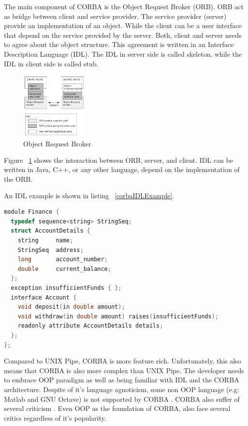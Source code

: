 \documentclass[conference]{IEEEtran}
\begin{document}
The main component of CORBA is the Object Request Broker (ORB). ORB act as bridge 
between client and service provider. The service provider (server) provide an 
implementation of an object. While the client can be a user interface that depend on
the service provided by the server. Both, client and server needs to agree about the
object structure. This agreement is written in an Interface Description Language (IDL).
The IDL in server side is called skeleton, while the IDL in client side is called stub.

\begin{figure}
	\centering
	\includegraphics[width=0.3\textwidth]
		{images/Orb.jpg}
	\caption{Object Request Broker}
	\label{fig:orb}
\end{figure}

Figure ~\ref{fig:orb} shows the interaction between ORB, server, and client.
IDL can be written in Java, C++, or any other language, depend on the implementation of
the ORB.

An IDL example is shown in listing ~\ref{corbaIDLExample}.

\begin{lstlisting}[caption=CORBA IDL Example in C++, label=corbaIDLExample, language=c, basicstyle=\small, breaklines=true]
module Finance {
  typedef sequence<string> StringSeq;
  struct AccountDetails {
    string     name;
    StringSeq  address;
    long       account_number;
    double     current_balance;
  };
  exception insufficientFunds { };
  interface Account {
    void deposit(in double amount);
    void withdraw(in double amount) raises(insufficientFunds);
    readonly attribute AccountDetails details;
  };
};
\end{lstlisting}

Compared to UNIX Pipe, CORBA is more feature rich. Unfortunately, this also means 
that CORBA is also more complex than UNIX Pipe. The developer needs to embrace OOP 
paradigm as well as being familiar with IDL and the CORBA architecture. 
Despite of it's language agnoticism, some non OOP language (e.g: Matlab and GNU Octave) 
is not supported by CORBA \cite{feilhauer2016def}. CORBA also suffer of several 
criticism \cite{henning2006rise}. Even OOP as the foundation of CORBA, also face several 
critics \cite{hadar2013intuition} regardless of it's popularity.
\end{document}
